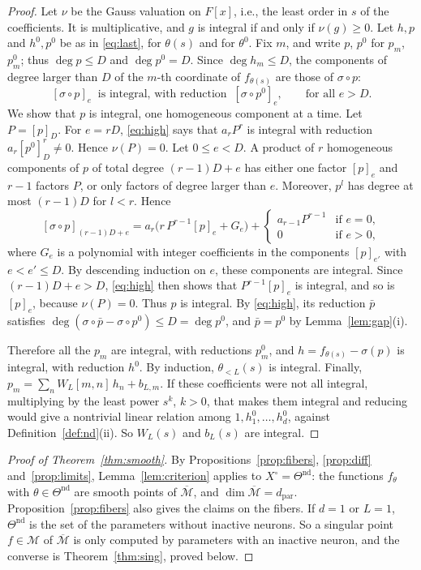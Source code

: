 \documentclass[11pt]{article}
\theoremstyle{definition}
\theoremstyle{remark}
\newcommand{\M}{\mathcal{M}}
\newcommand{\Mbar}{\overline{\M}}
\newcommand{\dpar}{d_{\mathrm{par}}}
\newcommand{\Tn}{\Theta^{\mathrm{nd}}}
\begin{document}
\begin{proof}
Let $\nu$ be the Gauss valuation on $F[x]$, i.e., the least order in $s$ of the coefficients. It is multiplicative, and $g$ is integral if and only if $\nu(g)\ge0$. Let $h,p$ and $h^0,p^0$ be as in \eqref{eq:last}, for $\theta(s)$ and for $\theta^0$. Fix $m$, and write $p$, $p^0$ for $p_m$, $p^0_m$; thus $\deg p\le D$ and $\deg p^0=D$. Since $\deg h_m\le D$, the components of degree larger than $D$ of the $m$-th coordinate of $f_{\theta(s)}$ are those of $\sigma\circ p$:
\begin{equation}\label{eq:high}
[\sigma\circ p]_e\ \text{ is integral, with reduction }\ [\sigma\circ p^0]_e,\qquad\text{for all } e>D.
\end{equation}
We show that $p$ is integral, one homogeneous component at a time. Let $P=[p]_D$. For $e=rD$, \eqref{eq:high} says that $a_rP^r$ is integral with reduction $a_r[p^0]_D^r\ne0$. Hence $\nu(P)=0$. Let $0\le e<D$. A product of $r$ homogeneous components of $p$ of total degree $(r-1)D+e$ has either one factor $[p]_e$ and $r-1$ factors $P$, or only factors of degree larger than $e$. Moreover, $p^l$ has degree at most $(r-1)D$ for $l<r$. Hence
\[
[\sigma\circ p]_{(r-1)D+e}=a_r\big(r\,P^{r-1}[p]_e+G_e\big)+\begin{cases}a_{r-1}P^{r-1}&\text{if }e=0,\\0&\text{if }e>0,\end{cases}
\]
where $G_e$ is a polynomial with integer coefficients in the components $[p]_{e'}$ with $e<e'\le D$. By descending induction on $e$, these components are integral. Since $(r-1)D+e>D$, \eqref{eq:high} then shows that $P^{r-1}[p]_e$ is integral, and so is $[p]_e$, because $\nu(P)=0$. Thus $p$ is integral. By \eqref{eq:high}, its reduction $\bar p$ satisfies $\deg(\sigma\circ\bar p-\sigma\circ p^0)\le D=\deg p^0$, and $\bar p=p^0$ by Lemma~\ref{lem:gap}(i).

Therefore all the $p_m$ are integral, with reductions $p^0_m$, and $h=f_{\theta(s)}-\sigma(p)$ is integral, with reduction $h^0$. By induction, $\theta_{<L}(s)$ is integral. Finally, $p_m=\sum_nW_L[m,n]\,h_n+b_{L,m}$. If these coefficients were not all integral, multiplying by the least power $s^k$, $k>0$, that makes them integral and reducing would give a nontrivial linear relation among $1,h^0_1,\dots,h^0_d$, against Definition~\ref{def:nd}(ii). So $W_L(s)$ and $b_L(s)$ are integral.
\end{proof}

\begin{proof}[Proof of Theorem~\ref{thm:smooth}]
By Propositions~\ref{prop:fibers}, \ref{prop:diff} and~\ref{prop:limits}, Lemma~\ref{lem:criterion} applies to $X^\circ=\Tn$: the functions $f_\theta$ with $\theta\in\Tn$ are smooth points of $\Mbar$, and $\dim\Mbar=\dpar$. Proposition~\ref{prop:fibers} also gives the claims on the fibers. If $d=1$ or $L=1$, $\Tn$ is the set of the parameters without inactive neurons. So a singular point $f\in\M$ of $\Mbar$ is only computed by parameters with an inactive neuron, and the converse is Theorem~\ref{thm:sing}, proved below.
\end{proof}
\end{document}

